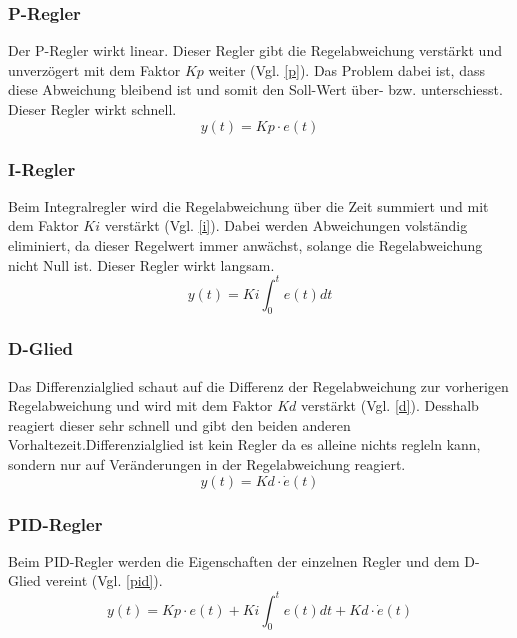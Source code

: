 \documentclass[12pt,a4paper, ngerman]{article}
\begin{document}
\subsubsection{P-Regler}
Der P-Regler wirkt linear. Dieser Regler gibt die Regelabweichung verstärkt und unverzögert mit dem Faktor $Kp$ weiter (Vgl. \ref{p}). Das Problem dabei ist, dass diese Abweichung bleibend ist und somit den Soll-Wert über- bzw. unterschiesst. Dieser Regler wirkt schnell.\cite{website:rn-wissen_Regelungstechnik}
\begin{equation}\label{p}
y(t)=Kp\cdot e(t)
\end{equation}
\newpage
\subsubsection{I-Regler}
Beim Integralregler wird die Regelabweichung über die Zeit summiert und mit dem Faktor $Ki$ verstärkt (Vgl. \ref{i}). Dabei werden Abweichungen volständig eliminiert, da dieser Regelwert immer anwächst, solange die Regelabweichung nicht Null ist. Dieser Regler wirkt langsam.\cite{website:rn-wissen_Regelungstechnik}\\
\begin{equation}\label{i}
y(t)=Ki\int_{0}^{t}e(t)dt
\end{equation}

\subsubsection{D-Glied}
Das Differenzialglied schaut auf die Differenz der Regelabweichung zur vorherigen Regelabweichung und wird mit dem Faktor $Kd$ verstärkt (Vgl. \ref{d}). Desshalb reagiert dieser sehr schnell und gibt den beiden anderen Vorhaltezeit.Differenzialglied ist kein Regler da es alleine nichts regleln kann, sondern nur auf Veränderungen in der Regelabweichung reagiert.\cite{website:rn-wissen_Regelungstechnik}\\
\begin{equation}\label{d}
y(t)=Kd\cdot \dot{e}(t)
\end{equation}

\subsubsection{PID-Regler}
Beim PID-Regler werden die Eigenschaften der einzelnen Regler und dem D-Glied vereint (Vgl. \ref{pid}).
\begin{equation}\label{pid}
y(t)=Kp\cdot e(t)+Ki\int_{0}^{t}e(t)dt+Kd\cdot \dot{e}(t)
\end{equation}
\newpage
\end{document}
